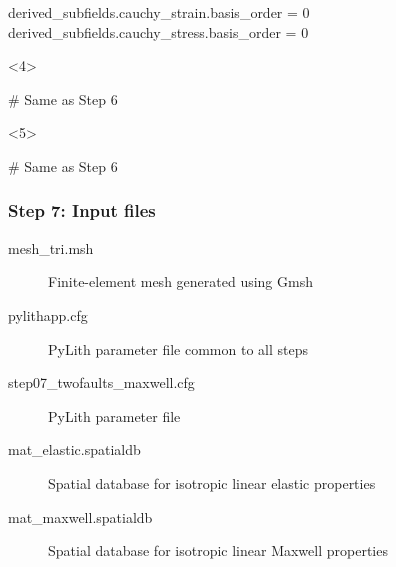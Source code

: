 \documentclass[aspectratio=169]{beamer}
\begin{document}
\begin{frame}[t,fragile]
\begin{minipage}[t]{0.67\textwidth}
\begin{onlyenv}
\begin{cfgcode}
        derived_subfields.cauchy_strain.basis_order = 0
        derived_subfields.cauchy_stress.basis_order = 0
      \end{cfgcode}
    \end{onlyenv}
    \begin{onlyenv}<4>
      \begin{cfgcode}
        # Same as Step 6
      \end{cfgcode}
    \end{onlyenv}
    \begin{onlyenv}<5>
      \begin{cfgcode}
        # Same as Step 6
      \end{cfgcode}
    \end{onlyenv}
  \end{minipage}

  
\end{frame}


\begin{frame}
  \frametitle{Step 7: Input files}
  \summary{}

  \begin{description}
  \item[mesh\_tri.msh] Finite-element mesh generated using Gmsh
  \item[pylithapp.cfg] PyLith parameter file common to all steps
  \item[step07\_twofaults\_maxwell.cfg] PyLith parameter file
  \item[mat\_elastic.spatialdb] Spatial database for isotropic linear elastic properties
  \item[mat\_maxwell.spatialdb] Spatial database for isotropic linear Maxwell properties
  \end{description}
    
\end{frame}
\end{document}

